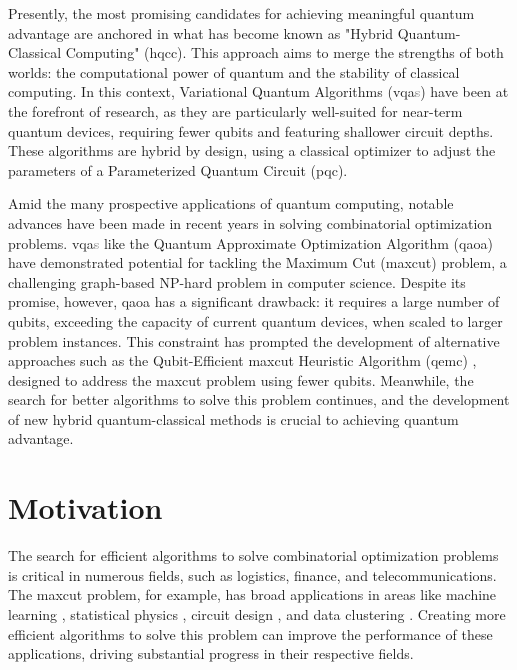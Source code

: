 Presently, the most promising candidates for achieving meaningful quantum advantage are anchored in what has become known as "Hybrid Quantum-Classical Computing" (\acrshort{hqcc}). This approach aims to merge the strengths of both worlds: the computational power of quantum and the stability of classical computing. In this context, Variational Quantum Algorithms (\acrshort{vqa}\textcolor{gray}{s}) have been at the forefront of research, as they are particularly well-suited for near-term quantum devices, requiring fewer qubits and featuring shallower circuit depths. These algorithms are hybrid by design, using a classical optimizer to adjust the parameters of a Parameterized Quantum Circuit (\acrshort{pqc}).

Amid the many prospective applications of quantum computing, notable advances have been made in recent years in solving combinatorial optimization problems. \acrshort{vqa}\textcolor{gray}{s} like the Quantum Approximate Optimization Algorithm (\acrshort{qaoa}) \cite{farhi2014quantum} have demonstrated potential for tackling the Maximum Cut (\acrshort{maxcut}) problem, a challenging graph-based NP-hard problem in computer science. Despite its promise, however, \acrshort{qaoa} has a significant drawback: it requires a large number of qubits, exceeding the capacity of current quantum devices, when scaled to larger problem instances. This constraint has prompted the development of alternative approaches such as the Qubit-Efficient \acrshort{maxcut} Heuristic Algorithm (\acrshort{qemc}) \cite{tenecohen2023variational}, designed to address the \acrshort{maxcut} problem using fewer qubits. Meanwhile, the search for better algorithms to solve this problem continues, and the development of new hybrid quantum-classical methods is crucial to achieving quantum advantage.

\section{Motivation}
\label{section:motivation}



The search for efficient algorithms to solve combinatorial optimization problems is critical in numerous fields, such as logistics, finance, and telecommunications. The \acrshort{maxcut} problem, for example, has broad applications in areas like machine learning \cite{937505}, statistical physics \cite{Barahona_Grötschel_Jünger_Reinelt_1988}, circuit design \cite{Barahona_Grötschel_Jünger_Reinelt_1988}, and data clustering \cite{10.1007/11893318_21}. Creating more efficient algorithms to solve this problem can improve the performance of these applications, driving substantial progress in their respective fields.


